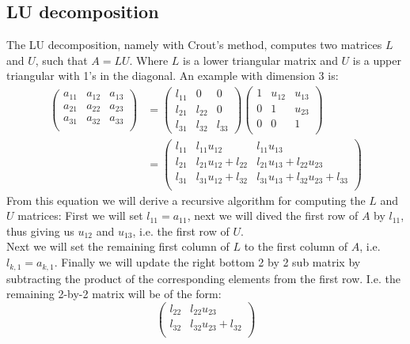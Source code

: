 \subsection*{LU decomposition}
The LU decomposition, namely with Crout's method, computes two matrices $L$ and $U$, such that $A=LU$. Where $L$ is a lower triangular matrix and $U$ is a upper triangular with 1's in the diagonal. An example with dimension 3 is:
\begin{align*}
	 \begin{pmatrix}
	 a_{11} & a_{12} & a_{13}\\
	 a_{21} & a_{22} & a_{23}\\
	 a_{31} & a_{32} & a_{33}\\
	 \end{pmatrix} & = \begin{pmatrix} l_{11}  & 0 & 0\\
	 l_{21} & l_{22} & 0\\
	 l_{31} & l_{32} & l_{33}
	 \end{pmatrix} \begin{pmatrix} 1 & u_{12} & u_{13}\\
	 0 & 1 & u_{23}\\
	 0 & 0 & 1\\
	 \end{pmatrix}\\
	& = \begin{pmatrix} l_{11} & l_{11} u_{12} & l_{11} u_{13}\\
	l_{21} & l_{21} u_{12} + l_{22} & l_{21} u_{13} + l_{22} u_{23}\\
	l_{31} & l_{31} u_{12} + l_{32} & l_{31} u_{13} + l_{32} u_{23} + l_{33}\\
	\end{pmatrix}
\end{align*} 
From this equation we will derive a recursive algorithm for computing the $L$ and $U$ matrices:
First we will set $l_{11} = a_{11}$, next we will dived the first row of $A$ by $l_{11}$, thus giving us $u_{12}$ and $u_{13}$, i.e. the first row of $U$.\\
Next we will set the remaining first column of $L$ to the first column of $A$, i.e. $l_{k,1} = a_{k,1}$. Finally we will update the right bottom 2 by 2 sub matrix by subtracting the product of the corresponding elements from the first row. I.e. the remaining 2-by-2 matrix will be of the form: 
\begin{equation*}
 \begin{pmatrix}
l_{22} & l_{22} u_{23}\\
l_{32} & l_{32} u_{23} + l_{32}\\
\end{pmatrix}
\end{equation*}
